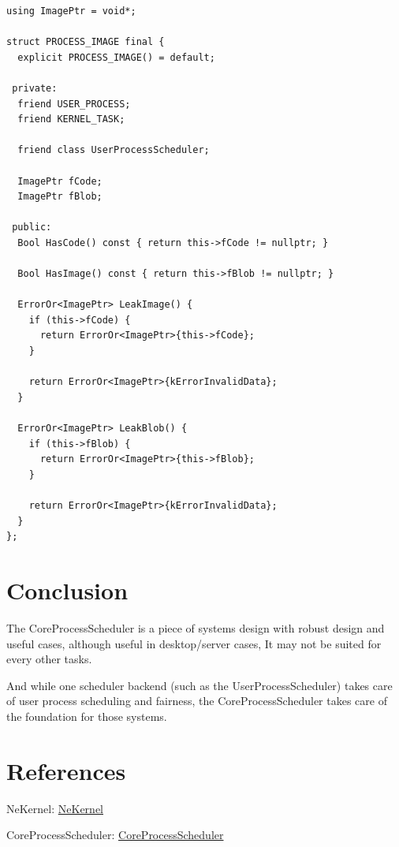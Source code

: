 \documentclass{article}
\begin{document}
\begin{verbatim}
using ImagePtr = void*;

struct PROCESS_IMAGE final {
  explicit PROCESS_IMAGE() = default;

 private:
  friend USER_PROCESS;
  friend KERNEL_TASK;

  friend class UserProcessScheduler;

  ImagePtr fCode;
  ImagePtr fBlob;

 public:
  Bool HasCode() const { return this->fCode != nullptr; }

  Bool HasImage() const { return this->fBlob != nullptr; }

  ErrorOr<ImagePtr> LeakImage() {
    if (this->fCode) {
      return ErrorOr<ImagePtr>{this->fCode};
    }

    return ErrorOr<ImagePtr>{kErrorInvalidData};
  }

  ErrorOr<ImagePtr> LeakBlob() {
    if (this->fBlob) {
      return ErrorOr<ImagePtr>{this->fBlob};
    }

    return ErrorOr<ImagePtr>{kErrorInvalidData};
  }
};

\end{verbatim}

\section{Conclusion}

{The CoreProcessScheduler is a piece of systems design with robust design and useful cases, although useful in desktop/server cases, It may not be suited for every other tasks.}

{And while one scheduler backend (such as the UserProcessScheduler) takes care of user process scheduling and fairness, the CoreProcessScheduler takes care of the foundation for those systems.}

\section{References}

{NeKernel}: \href{https://github.com/nekernel-org/nekernel}{NeKernel}

{CoreProcessScheduler}: \href{https://github.com/nekernel-org/nekernel/blob/develop/src/kernel/KernelKit/CoreProcessScheduler.h}{CoreProcessScheduler}
\end{document}

